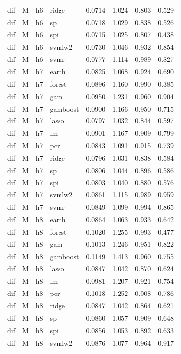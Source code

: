 \begin{ThreePartTable}
\begin{longtable}[t]{llclcccc}
dif & M & h6 & ridge & 0.0714 & 1.024 & 0.803 & 0.529\\
dif & M & h6 & sp & 0.0718 & 1.029 & 0.838 & 0.526\\
dif & M & h6 & spi & 0.0715 & 1.025 & 0.807 & 0.438\\
dif & M & h6 & svmlw2 & 0.0730 & 1.046 & 0.932 & 0.854\\
dif & M & h6 & svmr & 0.0777 & 1.114 & 0.989 & 0.827\\
\addlinespace
dif & M & h7 & earth & 0.0825 & 1.068 & 0.924 & 0.690\\
dif & M & h7 & forest & 0.0896 & 1.160 & 0.990 & 0.385\\
dif & M & h7 & gam & 0.0950 & 1.231 & 0.960 & 0.904\\
dif & M & h7 & gamboost & 0.0900 & 1.166 & 0.950 & 0.715\\
dif & M & h7 & lasso & 0.0797 & 1.032 & 0.844 & 0.597\\
dif & M & h7 & lm & 0.0901 & 1.167 & 0.909 & 0.799\\
dif & M & h7 & pcr & 0.0843 & 1.091 & 0.915 & 0.739\\
dif & M & h7 & ridge & 0.0796 & 1.031 & 0.838 & 0.584\\
dif & M & h7 & sp & 0.0806 & 1.044 & 0.896 & 0.586\\
dif & M & h7 & spi & 0.0803 & 1.040 & 0.880 & 0.576\\
dif & M & h7 & svmlw2 & 0.0861 & 1.115 & 0.989 & 0.959\\
dif & M & h7 & svmr & 0.0849 & 1.099 & 0.994 & 0.865\\
\addlinespace
dif & M & h8 & earth & 0.0864 & 1.063 & 0.933 & 0.642\\
dif & M & h8 & forest & 0.1020 & 1.255 & 0.993 & 0.477\\
dif & M & h8 & gam & 0.1013 & 1.246 & 0.951 & 0.822\\
dif & M & h8 & gamboost & 0.1149 & 1.413 & 0.960 & 0.755\\
dif & M & h8 & lasso & 0.0847 & 1.042 & 0.870 & 0.624\\
dif & M & h8 & lm & 0.0981 & 1.207 & 0.921 & 0.754\\
dif & M & h8 & pcr & 0.1018 & 1.252 & 0.908 & 0.786\\
dif & M & h8 & ridge & 0.0847 & 1.042 & 0.864 & 0.621\\
dif & M & h8 & sp & 0.0860 & 1.057 & 0.909 & 0.648\\
dif & M & h8 & spi & 0.0856 & 1.053 & 0.892 & 0.633\\
dif & M & h8 & svmlw2 & 0.0876 & 1.077 & 0.964 & 0.917\\

\end{longtable}
\end{ThreePartTable}
